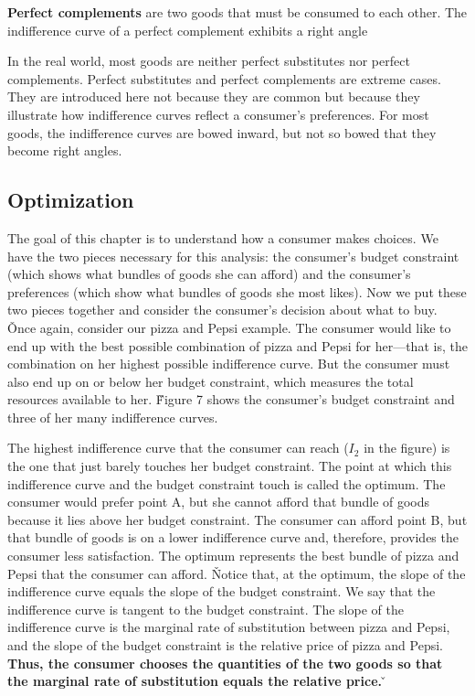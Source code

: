 \textbf{Perfect complements} are two goods that must be consumed to each other. The indifference curve of a perfect
complement exhibits a right angle
\ed

In the real world, most goods are neither perfect substitutes nor perfect complements. Perfect substitutes and
perfect complements are extreme cases. They are introduced here not because they are common but because they
illustrate how indifference curves reflect a consumer's preferences. For most goods, the indifference curves are
bowed inward, but not so bowed that they become right angles.

\subsection{Optimization}

The goal of this chapter is to understand how a consumer makes choices. We have the two pieces necessary for this
analysis: the consumer's budget constraint (which shows what bundles of goods she can afford) and the consumer's
preferences (which show what bundles of goods she most likes). Now we put these two pieces together and consider the
consumer's decision about what to buy. \v

Once again, consider our pizza and Pepsi example. The consumer would like to end up with the best possible
combination of pizza and Pepsi for her—that is, the combination on her highest possible indifference curve. But the
consumer must also end up on or below her budget constraint, which measures the total resources available to her. \v

Figure 7 shows the consumer's budget constraint and three of her many indifference curves.


The highest indifference curve that the consumer can reach ($I_2$ in the figure) is the one that just barely touches
her budget constraint. The point at which this indifference curve and the budget constraint touch is called the
optimum. The consumer would prefer point A, but she cannot afford that bundle of goods because it lies above her
budget constraint. The consumer can afford point B, but that bundle of goods is on a lower indifference curve and,
therefore, provides the consumer less satisfaction. The optimum represents the best bundle of pizza and Pepsi that
the consumer can afford. \v

Notice that, at the optimum, the slope of the indifference curve equals the slope of the budget constraint. We say
that the indifference curve is tangent to the budget constraint. The slope of the indifference curve is the marginal
rate of substitution between pizza and Pepsi, and the slope of the budget constraint is the relative price of pizza
and Pepsi. \textbf{Thus, the consumer chooses the quantities of the two goods so that the marginal rate of
substitution equals the relative price.} \v

